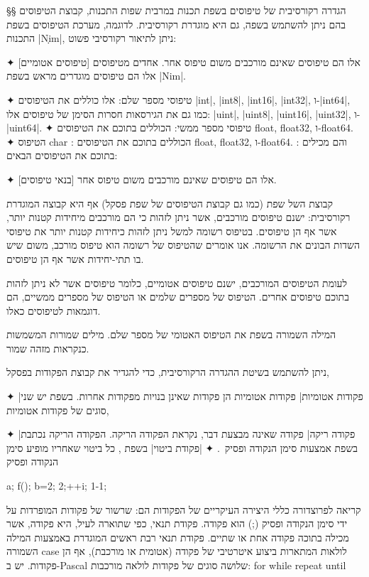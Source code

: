 §§ הגדרה רקורסיבית של טיפוסים בשפת תכנות
במרבית שפות התכנות, קבוצת הטיפוסים בהם ניתן להשתמש בשפה, גם היא מוגדרת
רקורסיבית. לדוגמה, מערכת הטיפוסים בשפת התכנות \E|Nִִִim|, ניתן לתיאור רקורסיבי
פשוט: 
\begin{description}
✦ [טיפוסים אטומיים] אלו הם טיפוסים שאינם מורכבים משום טיפוס אחר.  אחדים
מטיפוסים אלו הם טיפוסים מוגדרים מראש בשפת \E|Nim|.
\begin{description}
✦ {טיפוסי מספר שלם:}
אלו כוללים את הטיפוסים
\E|int|, \E|int8|, \E|int16|, \E|int32|, ו-\E|int64|,
כמו גם את הגירסאות חסרות הסימן של טיפוסים אלו:
\E|uint|, \E|uint8|, \E|uint16|, \E|uint32|, ו-\E|uint64|.
✦ {טיפוסי מספר ממשי:} הכוללים בתוכם את הטיפוסים float, float32, ו-float64.
✦ {הטיפוס char :} הכוללים בתוכם את הטיפוסים float, float32, ו-float64.
:
והם מכילים בתוכם את הטיפוסים הבאים:
\end{description}
✦ [בנאי טיפוסים] אלו הם טיפוסים שאינם מורכבים משום טיפוס אחר.
\end{description}

קבוצת ה של שפת  (כמו גם קבוצת הטיפוסים של שפת פסקל) אף היא קבוצה
המוגדרת רקורסיבית: ישנם טיפוסים מורכבים, אשר ניתן לזהות כי הם מורכבים מיחידות
קטנות יותר, אשר אף הן טיפוסים. בטיפוס רשומה למשל ניתן לזהות כיחידות קטנות יותר
את טיפוסי השדות הבונים את הרשומה. אנו אומרים שהטיפוס של רשומה הוא טיפוס
מורכב, משום שיש בו תתי-יחידות אשר אף הן טיפוסים.

לעומת הטיפוסים המורכבים, ישנם טיפוסים אטומיים, כלומר טיפוסים אשר לא ניתן לזהות
בתוכם טיפוסים אחרים. הטיפוס של מספרים שלמים או הטיפוס של מספרים ממשיים, הם
דוגמאות לטיפוסים כאלו.

המילה השמורה  בשפת   את הטיפוס האטומי של מספר שלם. מילים
שמורות המשמשות כ נקראות מזהה שמור.

ניתן להשתמש בשיטת ההגדרה הרקורסיבית, כדי להגדיר את קבוצת הפקודות בפסקל,

\begin{enumerate}
✦ \ע|פקודות אטומיות| פקודות אטומיות הן פקודות שאינן בנויות מפקודות אחרות. בשפת
 יש שני סוגים של פקודות אטומיות, 
\begin{enumerate}
✦ \ע|פקודה ריקה| פקודה שאינה מבצעת דבר, נקראת הפקודה הריקה. הפקודה הריקה נכתבת
בשפת אמצעות סימן הנקודה ופסיק~\cc{;}.
✦ \ע|פקודת ביטוי| בשפת , כל ביטוי שאחריו מופיע סימן הנקודה ופסיק~\cc{;|}
\begin{CPP}
  a; f(); b=2; 2;++i; 1-1;
\end{CPP}
\end{enumerate}
קריאה לפרוצדורה
כללי היצירה העיקריים של הפקודות הם:
שרשור של פקודות המופרדות על ידי סימן הנקודה ופסיק (;) הוא פקודה.
פקודת תנאי, כפי שתוארה לעיל, היא פקודה, אשר מכילה בתוכה פקודה אחת או שתיים.
פקודת תנאי רבת ראשים המוגדרת באמצעות המילה השמורה case
לולאות המתארות ביצוע איטרטיבי של פקודה (אטומית או מורכבת), אף הן פקודות. יש
ב-Pascal שלושה סוגים של פקודות לולאה מורכבות: for
while
repeat until
\end{enumerate}


